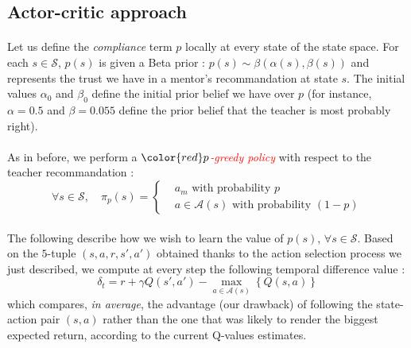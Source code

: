 \documentclass[a4paper]{report}
\begin{document}
{{{		\subsection{Actor-critic approach}
		{
			\paragraph{}  Let us define the \emph{compliance } term $p$ locally at every state of the state space. For each $s\in\mathcal{S}$, $p(s)$ is given a Beta prior : $p(s)\sim \beta(\alpha(s),\beta(s))$ and represents the trust we have in a mentor's recommandation at state $s$. The initial values $\alpha_0$ and $\beta_0$ define the initial prior belief we have over $p$ (for instance, $\alpha=0.5$ and $\beta = 0.055$ define the prior belief that the teacher is most probably right). 
			
			\paragraph{} As in before, we perform a $\color{red}p$\textcolor{red}{\emph{-greedy policy}} with respect to the teacher recommandation : 
			\begin{equation}
				\forall s\in\mathcal{S}, \quad \pi_p(s) = 
					\left\{ 
					\begin{aligned}
						&a_m \text{ with probability } p \\
						& a\in\mathcal{A}(s) \text{ with probability } (1-p)
					\end{aligned}
					\right. 
			\end{equation}
		
			\paragraph{} The following describe how we wish to learn the value of $p(s)$, $\forall s\in\mathcal{S}$. Based on the $5$-tuple $(s,a,r,s',a')$ obtained thanks to the action selection process we just described, we compute at every step the following temporal difference value : 
			\begin{equation}
				\delta_t = r + \gamma Q(s',a') - \max_{a\in\mathcal{A}(s)}{\left\{ Q(s,a)\right\}}
			\end{equation}
			which compares, \emph{in average}, the advantage (our drawback) of following the state-action pair $(s,a)$ rather than the one that was likely to render the biggest expected return, according to the current Q-values estimates. 
		
}}}}
\end{document}
